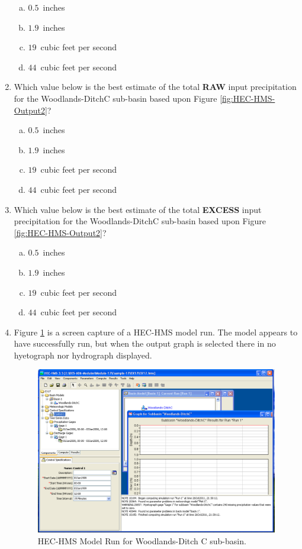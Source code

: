 \documentclass[12pt]{article}
\begin{document}
\begin{enumerate}
\begin{enumerate}[a)]
\item $0.5$~inches
\item $1.9$~inches
\item $19$~cubic feet per second
\item $44$~cubic feet per second
\end{enumerate}

\clearpage
\item Which value below is the best estimate of the total \textbf{RAW} input precipitation for the Woodlands-DitchC sub-basin based upon Figure \ref{fig:HEC-HMS-Output2}?

\begin{enumerate}[a)]
\item $0.5$~inches
\item $1.9$~inches
\item $19$~cubic feet per second
\item $44$~cubic feet per second
\end{enumerate}

\clearpage
\item Which value below is the best estimate of the total \textbf{EXCESS} input precipitation for the Woodlands-DitchC sub-basin based upon Figure \ref{fig:HEC-HMS-Output2}?

\begin{enumerate}[a)]
\item $0.5$~inches
\item $1.9$~inches
\item $19$~cubic feet per second
\item $44$~cubic feet per second
\end{enumerate}

\clearpage
\item Figure \ref{fig:HEC-HMS-Output3} is a screen capture of a HEC-HMS model run.  The model appears to have successfully run, but when the output graph is selected there in no hyetograph nor hydrograph displayed.

\begin{figure}[h!] %
   \centering
   \includegraphics[width=6in]{HEC-HMS-Output3.jpg} 
   \caption{HEC-HMS Model Run for Woodlands-Ditch C sub-basin.}
   \label{fig:HEC-HMS-Output3}
\end{figure}


\end{enumerate}
\end{document}
